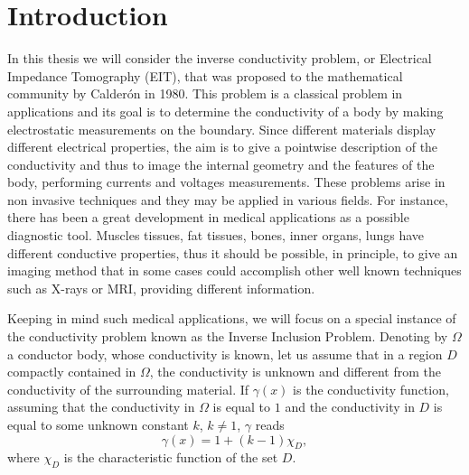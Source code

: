\documentclass[10pt, a4paper, twoside, openright]{book}
\theoremstyle{definition}
\theoremstyle{plain}
\theoremstyle{plain}
\theoremstyle{plain}
\theoremstyle{plain}
\theoremstyle{plain}
\theoremstyle{plain}
\theoremstyle{plain}
\theoremstyle{plain}
\begin{document}
\chapter{Introduction}
In this thesis we will consider the inverse conductivity problem, or Electrical Impedance Tomography (EIT),
that was proposed to the mathematical community by Calder\'on \cite{Ca} in 1980.
This problem is a classical problem in applications and its goal is to determine the conductivity of a body by making electrostatic
measurements on the boundary. Since different materials display different electrical properties, the aim is to give a pointwise
description of the conductivity and thus to image the internal geometry and the features of the body, performing currents and voltages measurements.
These problems arise in non invasive techniques and they may be applied in various fields. For instance, there has been a
great development in medical applications as a possible diagnostic tool.
Muscles tissues, fat tissues, bones, inner organs, lungs have different conductive properties, thus it should be possible, in principle,
to give an imaging method that in some cases could accomplish other well known techniques such as X-rays or MRI, providing different information.

Keeping in mind such medical applications, we will focus on a special instance of the conductivity problem known as the Inverse Inclusion Problem.
Denoting by $\Omega$ a conductor body, whose conductivity is known, let us assume that in a region $D$ compactly contained in $\Omega$,
the conductivity is unknown and different from the conductivity of the surrounding material. If $\gamma(x)$ is the conductivity function,
assuming that the conductivity in $\Omega$ is equal to $1$ and the conductivity in $D$ is equal to some unknown constant $k$, $k\neq1$,
$\gamma$ reads
$$\gamma(x)=1+(k-1)\chi_D,$$
where $\chi_D$ is the characteristic function of the set $D$.
\end{document}
